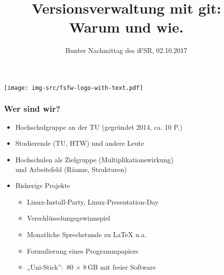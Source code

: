 \documentclass{beamer}
\title{Versionsverwaltung mit git: Warum und wie.}
\subtitle{Bunter Nachmittag des iFSR, 02.10.2017}
\begin{document}
\begin{frame}
  \begin{center}%
    \texttt{[image: img-src/fsfw-logo-with-text.pdf]}\\

    \vspace*{-0.5\baselineskip}

    \parbox{.95\columnwidth}{\centering\Large\inserttitle}

    \vspace*{\baselineskip}

    \structure{\large \insertsubtitle}
  \end{center}
\end{frame}

\begin{frame}[label=wb]

\begin{center}
 \vspace{10mm}
\end{center}

\end{frame}



\begin{frame}[label=ct1]
  \frametitle{Wer sind wir?}

  \onslide<+->

  \begin{itemize}
  \item Hochschulgruppe an der TU (gegründet 2014, ca. 10 P.)
  \item Studierende (TU, HTW) und andere Leute
  \item Hochschulen als Zielgruppe (Multiplikationswirkung)\\
    und Arbeitsfeld (Räume, Strukturen)

    \bigskip\onslide<+->

  \item Bisherige Projekte
    \begin{itemize}
    \item Linux-Install-Party, Linux-Presentation-Day
    \item Verschlüsselungsgewinnspiel
    \item Monatliche Sprechstunde zu \LaTeX{} u.a.
    \item Formulierung eines Programmpapiers
    \item „Uni-Stick”:~80 $\times$ 8\,GB mit freier Software
    \end{itemize}
  \end{itemize}
\end{frame}
\end{document}
